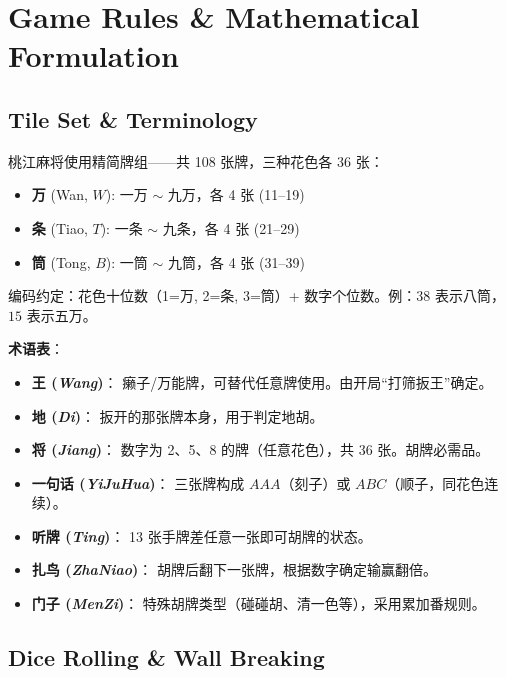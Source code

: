 \documentclass[11pt,a4paper]{article}
\begin{document}
\section{Game Rules \& Mathematical Formulation}

\subsection{Tile Set \& Terminology}

桃江麻将使用精简牌组——共 108 张牌，三种花色各 36 张：

\begin{itemize}[nosep]
  \item \textbf{万} (Wan, $W$): 一万 $\sim$ 九万，各 4 张 (11--19)
  \item \textbf{条} (Tiao, $T$): 一条 $\sim$ 九条，各 4 张 (21--29)
  \item \textbf{筒} (Tong, $B$): 一筒 $\sim$ 九筒，各 4 张 (31--39)
\end{itemize}

编码约定：花色十位数（1=万, 2=条, 3=筒）+ 数字个位数。例：$38$ 表示八筒，$15$ 表示五万。

\textbf{术语表}：
\begin{itemize}[nosep]
  \item \textbf{王 (\textit{Wang})}： 癞子/万能牌，可替代任意牌使用。由开局``打筛扳王''确定。
  \item \textbf{地 (\textit{Di})}： 扳开的那张牌本身，用于判定地胡。
  \item \textbf{将 (\textit{Jiang})}： 数字为 2、5、8 的牌（任意花色），共 36 张。胡牌必需品。
  \item \textbf{一句话 (\textit{YiJuHua})}： 三张牌构成 $AAA$（刻子）或 $ABC$（顺子，同花色连续）。
  \item \textbf{听牌 (\textit{Ting})}： 13 张手牌差任意一张即可胡牌的状态。
  \item \textbf{扎鸟 (\textit{ZhaNiao})}： 胡牌后翻下一张牌，根据数字确定输赢翻倍。
  \item \textbf{门子 (\textit{MenZi})}： 特殊胡牌类型（碰碰胡、清一色等），采用累加番规则。
\end{itemize}

\subsection{Dice Rolling \& Wall Breaking}
\end{document}
